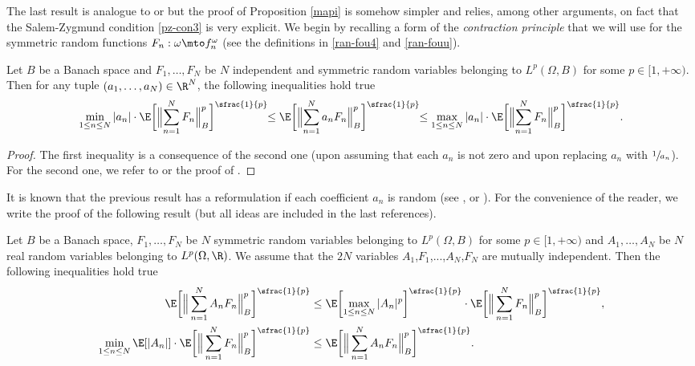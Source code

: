 The last result is analogue to \cite[p.\,53, Lem.\,1.1]{pisier1981} or \cite[p.\,249, Th.\,III.6]{queff2} but the proof of Proposition \ref{mapi} is somehow simpler and relies, among other arguments, on fact that the Salem-Zygmund condition \eqref{pz-con3} is very explicit.
We begin by recalling a form of the \textit{contraction principle} that we will use for the symmetric random functions $F_n:\omega\mto f_n^\omega$ (see the definitions in \eqref{ran-fou4} and \eqref{ran-fouu}).
\begin{prop}\label{p-con-1}
Let $B$ be a Banach space and $F_1,\dots,F_N$ be $N$ independent and symmetric random variables belonging to $L^p(\Omega,B)$ for some $p\in [1,+\infty)$. Then for any tuple $(a_1,\dots,a_N)\in \R^N$, the following inequalities hold true
\begin{equation*}
\min_{1\leq n \leq N}|a_n|\cdot \E\biggl[\Bigl\| \sum_{n=1}^N F_n \Bigr\|_{B}^p \biggr]^{\sfrac{1}{p}}\!\!\leq \E\biggl[\Bigl\| \sum_{n=1}^N a_n F_n \Bigr\|_{B}^p \biggr]^{\sfrac{1}{p}}\!\!\leq
\max_{1\leq n\leq N} |a_n|\cdot \E\biggl[\Bigl\| \sum_{n=1}^N F_n \Bigr\|_{B}^p \biggr]^{\sfrac{1}{p}}.
\end{equation*}
\end{prop}
\begin{proof}
The first inequality is a consequence of the second one (upon assuming that each $a_n$ is not zero and upon replacing $a_n$ with $\sfrac{1}{a_n}$).
For the second one, we refer to \cite[p.\,136]{queff1} or the proof of \cite[Th.\,4.4]{ledoux}.
\end{proof}

It is known that the previous result has a reformulation if each coefficient $a_n$ is random (see
\cite[Lem.\,4.5]{ledoux}, \cite[Th.\,4.9, p.\,45]{pisier1981} or \cite[p.\,137, Th.\,IV.4]{queff1}).
For the convenience of the reader, we write the proof of the following result (but all ideas are included in the last references).

\begin{coro}
Let $B$ be a Banach space, $F_1,\dots,F_N$ be $N$ symmetric random variables belonging to $L^p(\Omega,B)$ for some $p\in [1,+\infty)$ and $A_1,\dots,A_N$ be $N$ real random variables belonging to $L^p(\Omega,\R)$.
We assume that the $2N$ variables $A_1$,$F_1$,...,$A_N$,$F_N$ are mutually independent.
Then the following inequalities hold true
\begin{align}\label{p-con-maj}
\E\biggl[\Big\| \sum_{n=1}^N A_n F_n \Big\|_{B}^p \biggr]^{\sfrac{1}{p}}
& \leq \E\biggl[\max_{1\leq n \leq N} |A_n|^p\biggr]^{\sfrac{1}{p}}\cdot \E\biggl[\Big\| \sum_{n=1}^N F_n \Big\|_{B}^p \biggr]^{\sfrac{1}{p}},\\ \label{p-con-min}
\min_{1\leq n\leq N}\E[|A_n|]\cdot \E\biggl[\Big\| \sum_{n=1}^N F_n \Big\|_{B}^p \biggr]^{\sfrac{1}{p}}& \leq \E\biggl[\Big\| \sum_{n=1}^N A_n F_n \Big\|_{B}^p \biggr]^{\sfrac{1}{p}}.
\end{align}
\end{coro}

